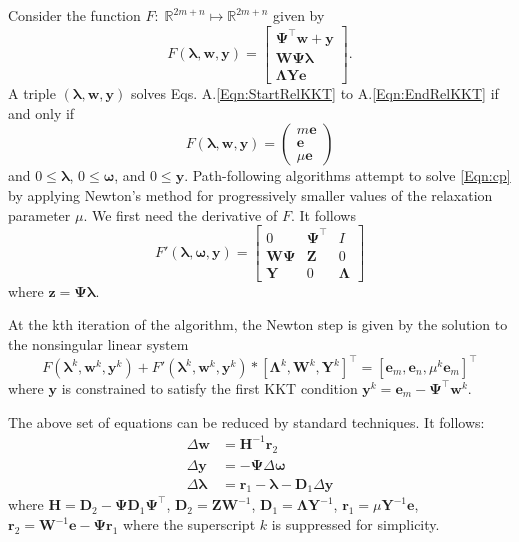 Consider the function $F: \; \mathbb{R}^{2m+n} \mapsto \mathbb{R}^{2m+n}$ given by
\[
	F(\bm{\lambda}, \bm{w}, \bm{y}) = \begin{bmatrix}
			\bm{\Psi}^\intercal \bm{w} + \bm{y} \\
			\bm{W}\bm{\Psi}\bm{\lambda} \\
			\bm{\Lambda} \bm{Y} \bm{e}
		\end{bmatrix} .
\]
A triple $(\bm{\lambda},\bm{w},\bm{ y})$ solves Eqs. A.\ref{Eqn:StartRelKKT} to A.\ref{Eqn:EndRelKKT} if and only if
\begin{equation}
	F \left(\bm{\lambda}, \bm{w}, \bm{y} \right) =
		\left( \begin{array}{c}
				m\bm{e} \\
				\bm{e} \\
				\mu \bm{e} 
		\end{array} \right) \label{Eqn:cp}
\end{equation}
and $0 \le \bm{\lambda}$, $0 \le \bm{\omega}$, and $0 \le \bm{y}$.
%
Path-following algorithms attempt to solve \ref{Eqn:cp} by applying Newton's method for progressively smaller values of the relaxation parameter $\mu$.
%
We first need the derivative of $F$. It follows
\[
	F'(\bm{\lambda}, \bm{\omega}, \bm{y}) = 
		\begin{bmatrix}
			0 & \bm{\Psi}^\intercal & I \\
			\bm{W} \bm{\Psi} & \bm{Z}& 0 \\
			\bm{Y} & 0 & \bm{\Lambda}
		\end{bmatrix}
\]
where $\bm{z} = \bm{\Psi} \bm{\lambda}$.


At the kth iteration of the algorithm, the Newton step is given by the solution to the nonsingular linear system
\begin{equation}
	F \left( \bm{\lambda}^k, \bm{w}^k, \bm{y}^k \right) +
		F' \left( \bm{\lambda}^k, \bm{w}^k, \bm{y}^k \right)
		*\left[ \bm{\Lambda}^k, \bm{W}^k, \bm{Y}^k \right]^\intercal
	= \left[ \bm{e}_m , \bm{e}_n, \mu^k \bm{e}_m \right]^\intercal
\label{Eqn:NewtonUpdate}
\end{equation}
where $\bm{y}$  is constrained to satisfy the first KKT condition $\bm{y}^k=\bm{e}_m-\bm{\Psi}^\intercal \bm{w}^k$.

The above set of equations can be reduced by standard techniques.
It follows:
\begin{align}
\Delta \bm{w} &=\bm{H}^{-1} \bm{r}_2\label{Eqn:Start}\\
\Delta \bm{y} &= -\bm{\Psi} \Delta \bm{\omega}\\
\Delta \bm{\lambda} &= \bm{r}_1 - \bm{\lambda}  - \bm{D}_1 \Delta \bm{y}
\end{align}
where
$\bm{H} =\bm{D}_2 - \bm{\Psi} \bm{D}_1 \bm{\Psi}^\intercal$, 
$\bm{D}_2= \bm{Z}\bm{W}^{-1}$, 
$\bm{D}_1= \bm{\Lambda} \bm{Y}^{-1}$,
$\bm{r}_1=\mu \bm{Y}^{-1} \bm{e}$,  $\bm{r}_2 = \bm{W}^{-1} \bm{e} - \bm{\Psi} \bm{r}_1$
where the superscript $k$ is suppressed for simplicity.

